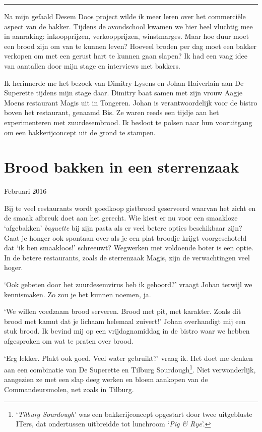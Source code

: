\documentclass[
  11pt,
  dutch,
]{memoir}
\begin{document}
\pfbreak

Na mijn gefaald Desem Doos project wilde ik meer leren over het
commerciële aspect van de bakker. Tijdens de avondschool kwamen we hier
heel vluchtig mee in aanraking: inkoopprijzen, verkoopprijzen,
winstmarges. Maar hoe duur moet een brood zijn om van te kunnen leven?
Hoeveel broden per dag moet een bakker verkopen om met een gerust hart
te kunnen gaan slapen? Ik had een vaag idee van aantallen door mijn
stage en interviews met bakkers.

Ik herinnerde me het bezoek van Dimitry Lysens en Johan Haiverlain aan
De Superette tijdens mijn stage daar. Dimitry baat samen met zijn vrouw
Aagje Moens restaurant Magis uit in Tongeren. Johan is verantwoordelijk
voor de bistro boven het restaurant, genaamd Bis. Ze waren reeds een
tijdje aan het experimenteren met zuurdesembrood. Ik besloot te polsen
naar hun vooruitgang om een bakkerijconcept uit de grond te stampen.

\hypertarget{brood-bakken-in-een-sterrenzaak}{%
\section{Brood bakken in een
sterrenzaak}\label{brood-bakken-in-een-sterrenzaak}}

\begin{flushright}
Februari 2016
\end{flushright}

Bij te veel restaurants wordt goedkoop gistbrood geserveerd waarvan het
zicht en de smaak afbreuk doet aan het gerecht. Wie kiest er nu voor een
smaakloze `afgebakken' \emph{baguette} bij zijn pasta als er veel betere
opties beschikbaar zijn? Gaat je honger ook spontaan over als je een
plat broodje krijgt voorgeschoteld dat `ik ben smaakloos!' schreeuwt?
Wegwerken met voldoende boter is een optie. In de betere restaurants,
zoals de sterrenzaak Magis, zijn de verwachtingen veel hoger.

`Ook gebeten door het zuurdesemvirus heb ik gehoord?' vraagt Johan
terwijl we kennismaken. Zo zou je het kunnen noemen, ja.

`We willen voedzaam brood serveren. Brood met pit, met karakter. Zoals
dit brood met kamut dat je lichaam helemaal zuivert!' Johan overhandigt
mij een stuk brood. Ik bevind mij op een vrijdagnamiddag in de bistro
waar we hebben afgesproken om wat te praten over brood.

`Erg lekker. Plakt ook goed. Veel water gebruikt?' vraag ik. Het doet me
denken aan een combinatie van De Superette en Tilburg
Sourdough\footnote{`\emph{Tilburg Sourdough}' was een bakkerijconcept
  opgestart door twee uitgebluste ITers, dat ondertussen uitbreidde tot
  lunchroom `\emph{Pig \& Rye}'.}. Niet verwonderlijk, aangezien ze met
een slap deeg werken en bloem aankopen van de Commandeursmolen, net
zoals in Tilburg.
\end{document}

